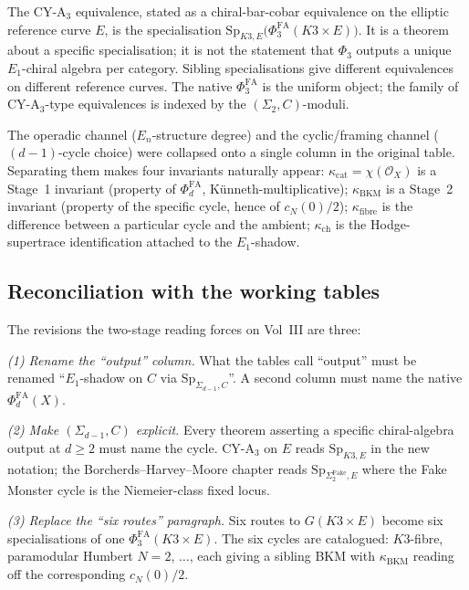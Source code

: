 \begin{remark}[Scope of CY-A$_3$]
\label{rem:cy-a3-specialisation}
The CY-A$_3$ equivalence, stated as a chiral-bar-cobar equivalence on
the elliptic reference curve $E$, is the specialisation
$\mathrm{Sp}_{K3,E}\bigl(\Phi^{\mathrm{FA}}_3(K3\times E)\bigr)$. It is a
theorem about a specific specialisation; it is not the statement that
$\Phi_3$ outputs a unique $E_1$-chiral algebra per category. Sibling
specialisations give different equivalences on different reference
curves. The native $\Phi^{\mathrm{FA}}_3$ is the uniform object; the
family of CY-A$_3$-type equivalences is indexed by the
$(\Sigma_2,C)$-moduli.
\end{remark}

\begin{remark}
The operadic channel ($E_n$-structure degree) and the cyclic/framing
channel ($(d-1)$-cycle choice) were collapsed onto a single column in
the original table. Separating them makes four invariants naturally
appear: $\kappa_{\mathrm{cat}}=\chi(\mathcal O_X)$ is a Stage~1 invariant
(property of $\Phi^{\mathrm{FA}}_d$, Künneth-multiplicative); $\kappa_{\mathrm{BKM}}$
is a Stage~2 invariant (property of the specific cycle, hence of
$c_N(0)/2$); $\kappa_{\mathrm{fibre}}$ is the difference between a
particular cycle and the ambient; $\kappa_{\mathrm{ch}}$ is the
Hodge-supertrace identification attached to the $E_1$-shadow.
\end{remark}

\subsection{Reconciliation with the working tables}

The revisions the two-stage reading forces on Vol~III are three:

\emph{(1) Rename the ``output'' column.} What the tables call
``output'' must be renamed ``$E_1$-shadow on $C$ via
$\mathrm{Sp}_{\Sigma_{d-1},C}$''. A second column must name the native
$\Phi^{\mathrm{FA}}_d(X)$.

\emph{(2) Make $(\Sigma_{d-1},C)$ explicit.} Every theorem asserting a
specific chiral-algebra output at $d\geq 2$ must name the cycle.
CY-A$_3$ on $E$ reads $\mathrm{Sp}_{K3,E}$ in the new notation; the
Borcherds--Harvey--Moore chapter reads $\mathrm{Sp}_{\Sigma_2^{\mathrm{Fake}},E}$
where the Fake Monster cycle is the Niemeier-class fixed locus.

\emph{(3) Replace the ``six routes'' paragraph.} Six routes to
$G(K3\times E)$ become six specialisations of one
$\Phi^{\mathrm{FA}}_3(K3\times E)$. The six cycles are catalogued:
$K3$-fibre, paramodular Humbert $N=2$, $\ldots$, each giving a sibling
BKM with $\kappa_{\mathrm{BKM}}$ reading off the corresponding
$c_N(0)/2$.

